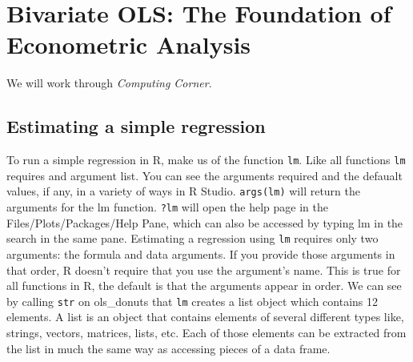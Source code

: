 \documentclass[]{book}
\newenvironment{Shaded}{\begin{snugshade}}{\end{snugshade}}
\newcommand{\DataTypeTok}[1]{\textcolor[rgb]{0.13,0.29,0.53}{#1}}
\newcommand{\KeywordTok}[1]{\textcolor[rgb]{0.13,0.29,0.53}{\textbf{#1}}}
\newcommand{\NormalTok}[1]{#1}
\newcommand{\OperatorTok}[1]{\textcolor[rgb]{0.81,0.36,0.00}{\textbf{#1}}}
\newcommand{\StringTok}[1]{\textcolor[rgb]{0.31,0.60,0.02}{#1}}
\begin{document}
\hypertarget{cph3}{%
\chapter{Bivariate OLS: The Foundation of Econometric Analysis}\label{cph3}}

We will work through \emph{Computing Corner}.

\hypertarget{estimating-a-simple-regression}{%
\section{Estimating a simple regression}\label{estimating-a-simple-regression}}

To run a simple regression in R, make us of the function \texttt{lm}. Like all functions \texttt{lm} requires and argument list. You can see the arguments required and the defaualt values, if any, in a variety of ways in R Studio. \texttt{args(lm)} will return the arguments for the lm function. \texttt{?lm} will open the help page in the Files/Plots/Packages/Help Pane, which can also be accessed by typing lm in the search in the same pane. Estimating a regression using \texttt{lm} requires only two arguments: the formula and data arguments. If you provide those arguments in that order, R doesn't require that you use the argument's name. This is true for all functions in R, the default is that the arguments appear in order. We can see by calling \texttt{str} on ols\_donuts that \texttt{lm} creates a list object which contains 12 elements. A list is an object that contains elements of several different types like, strings, vectors, matrices, lists, etc. Each of those elements can be extracted from the list in much the same way as accessing pieces of a data frame.

\begin{Shaded}
\end{Shaded}
\end{document}
